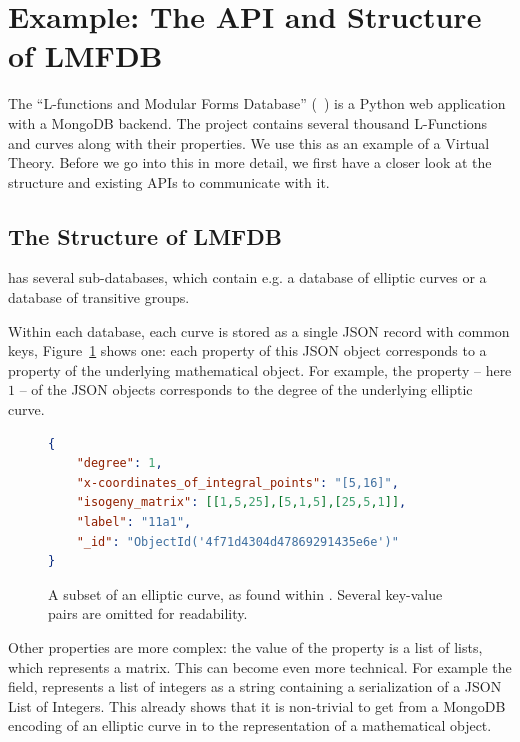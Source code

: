 \section{Example: The API and Structure of LMFDB}\label{sec:sota}

The ``L-functions and Modular Forms Database'' (\lmfdb~\cite{lmfdb}) is a Python web application with a MongoDB backend. 
The project contains several thousand L-Functions and curves along with their properties. 
We use this as an example of a Virtual Theory. 
Before we go into this in more detail, we first have a closer look at the structure and existing APIs to communicate with it.

\subsection{The Structure of LMFDB}\label{sec:sota:struct}

\lmfdb has several sub-databases, which contain e.g. a database of elliptic curves or a database of transitive groups. 

Within each database, each curve is stored as a single JSON record with common keys, Figure~\ref{fig:lmfdbexample} shows one: each property of this JSON object corresponds to a property of the underlying mathematical object. 
For example, the  property -- here $1$ -- of the JSON objects corresponds to the degree of the underlying elliptic curve. 

\begin{figure}[ht]\centering
      \begin{lstlisting}[language=json]
{
    "degree": 1,
    "x-coordinates_of_integral_points": "[5,16]",
    "isogeny_matrix": [[1,5,25],[5,1,5],[25,5,1]],
    "label": "11a1",
    "_id": "ObjectId('4f71d4304d47869291435e6e')"
}
      \end{lstlisting}\vspace*{-1.5em}
  \caption[An elliptic curve from \lmfdb]{
    A subset of an elliptic curve, as found within \lmfdb. 
    Several key-value pairs are omitted for readability. 
  }
  \label{fig:lmfdbexample}
\end{figure}

Other properties are more complex: the value of the  property is a list of lists, which represents a matrix. 
This can become even more technical. 
For example the  field, \lmfdb represents a list of integers as a string containing a serialization of a JSON List of Integers. 
This already shows that it is non-trivial to get from a MongoDB encoding of an elliptic curve in \lmfdb to the representation of a mathematical object. 


